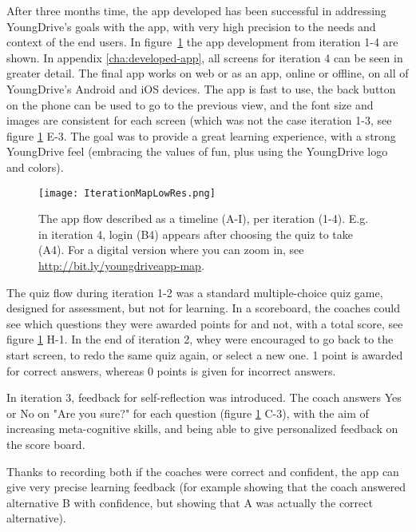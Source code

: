 After three months time, the app developed has been successful in addressing YoungDrive's goals with the app, with very high precision to the needs and context of the end users. In figure~\ref{fig:iteration-map} the app development from iteration 1-4 are shown. In appendix \ref{cha:developed-app}, all screens for iteration 4 can be seen in greater detail. The final app works on web or as an app, online or offline, on all of YoungDrive's Android and iOS devices. The app is fast to use, the back button on the phone can be used to go to the previous view, and the font size and images are consistent for each screen (which was not the case iteration 1-3, see figure \ref{fig:iteration-map} E-3. The goal was to provide a great learning experience, with a strong YoungDrive feel (embracing the values of fun, plus using the YoungDrive logo and colors).

  \begin{figure}[h]
    \centering
    \texttt{[image: IterationMapLowRes.png]}
    \caption{The app flow described as a timeline (A-I), per iteration (1-4). E.g. in iteration 4, login (B4) appears after choosing the quiz to take (A4). For a digital version where you can zoom in, see \url{http://bit.ly/youngdriveapp-map}.}
    \label{fig:iteration-map}
  \end{figure}

  \clearpage


  The quiz flow during iteration 1-2 was a standard multiple-choice quiz game, designed for assessment, but not for learning. In a scoreboard, the coaches could see which questions they were awarded points for and not, with a total score, see figure \ref{fig:iteration-map} H-1. In the end of iteration 2, whey were encouraged to go back to the start screen, to redo the same quiz again, or select a new one. 1 point is awarded for correct answers, whereas 0 points is given for incorrect answers.

  In iteration 3, feedback for self-reflection was introduced. The coach answers Yes or No on "Are you sure?" for each question (figure \ref{fig:iteration-map} C-3), with the aim of increasing meta-cognitive skills, and being able to give personalized feedback on the score board.

  Thanks to recording both if the coaches were correct and confident, the app can give very precise learning feedback (for example showing that the coach answered alternative B with confidence, but showing that A was actually the correct alternative).

